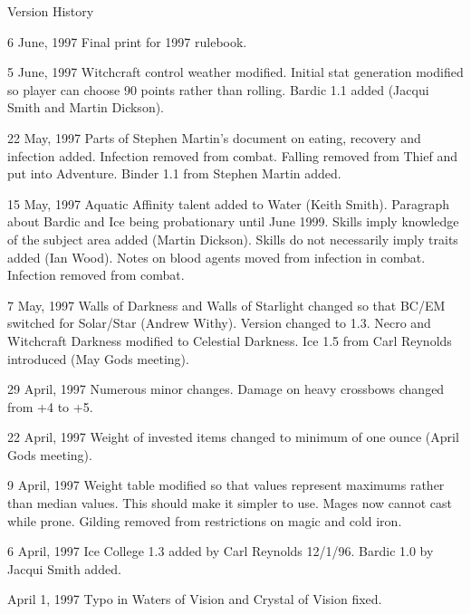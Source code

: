 \begin{Chapter}{Version History}
\begin{Description}

\item[6 June, 1997] Final print for 1997 rulebook. 

\item[5 June, 1997] Witchcraft control weather modified.  Initial stat
  generation modified so player can choose 90 points rather than
  rolling.  Bardic 1.1 added (Jacqui Smith and Martin Dickson).

\item[22 May, 1997] Parts of Stephen Martin’s document on eating,
  recovery and infection added.  Infection removed from combat.
  Falling removed from Thief and put into Adventure.  Binder 1.1 from
  Stephen Martin added.

\item[15 May, 1997] Aquatic Affinity talent added to Water (Keith
  Smith).  Paragraph about Bardic and Ice being probationary until
  June 1999.  Skills imply knowledge of the subject area added (Martin
  Dickson).  Skills do not necessarily imply traits added (Ian Wood).
  Notes on blood agents moved from infection in combat. Infection
  removed from combat.

\item[7 May, 1997] Walls of Darkness and Walls of Starlight changed so
  that BC/EM switched for Solar/Star (Andrew Withy).  Version changed
  to 1.3.  Necro and Witchcraft Darkness modified to Celestial
  Darkness.  Ice 1.5 from Carl Reynolds introduced (May Gods
  meeting).

\item[29 April, 1997] Numerous minor changes. Damage on heavy
  crossbows changed from +4 to +5.

\item[22 April, 1997] Weight of invested items changed to minimum of
  one ounce (April Gods meeting).

\item[9 April, 1997] Weight table modified so that values represent
  maximums rather than median values.  This should make it simpler to
  use.  Mages now cannot cast while prone.  Gilding removed from
  restrictions on magic and cold iron.

\item[6 April, 1997] Ice College 1.3 added by Carl Reynolds
  12/1/96. Bardic 1.0 by Jacqui Smith added.

\item[April 1, 1997] Typo in Waters of Vision and Crystal of Vision
  fixed.


\end{Description}
\end{Chapter}
